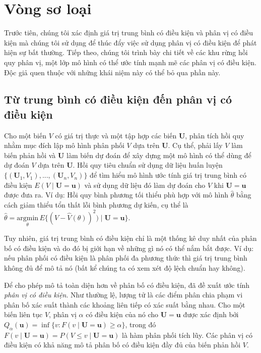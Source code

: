 \section{Vòng sơ loại}
\label{sec:prelim}

Trước tiên, chúng tôi xác định giá trị trung bình có điều kiện và phân vị có điều kiện mà chúng tôi sử dụng để thúc đẩy việc sử dụng phân vị có điều kiện để phát hiện sự bất thường. Tiếp theo, chúng tôi trình bày chi tiết về các khu rừng hồi quy phân vị, một lớp mô hình có thể ước tính mạnh mẽ các phân vị có điều kiện. Độc giả quen thuộc với những khái niệm này có thể bỏ qua phần này.


\subsection{Từ trung bình có điều kiện đến phân vị có điều kiện}
\label{subsec:meantoquantiles}

Cho một biến $V$ có giá trị thực và một tập hợp các biến $\mathbf{U}$, phân tích hồi quy nhằm mục đích lập mô hình phân phối $V$ dựa trên $\mathbf{U}$. Cụ thể, phải lấy $V$ làm biến phản hồi và $\mathbf{U}$ làm biến dự đoán để xây dựng một mô hình có thể dùng để dự đoán $V$ dựa trên $\mathbf{U}$.
Hồi quy tiêu chuẩn sử dụng dữ liệu huấn luyện $\{(\mathbf{U}_{1},V_{1}),...,(\mathbf{U}_{n},V_{n})\}$ để tìm hiểu mô hình ước tính giá trị trung bình có điều kiện $E(V \mid \mathbf{U}=\mathbf{u})$ và sử dụng dữ liệu đó làm dự đoán cho $V$ khi $\mathbf{U}=\mathbf{u}$ được đưa ra. Ví dụ: Hồi quy bình phương tối thiểu phù hợp với mô hình $\hat{\theta}$ bằng cách giảm thiểu tổn thất lỗi bình phương dự kiến, cụ thể là $\hat{\theta} =  \underset{\theta}{\mathrm{argmin}}\, E\{(V-\hat{V}(\theta))^{2})\mid \mathbf{U}=\mathbf{u}\}$.

Tuy nhiên, giá trị trung bình có điều kiện chỉ là một thống kê duy nhất của phân bố có điều kiện và do đó bị giới hạn về những gì nó có thể nắm bắt được. Ví dụ: nếu phân phối có điều kiện là phân phối đa phương thức thì giá trị trung bình không đủ để mô tả nó (bất kể chúng ta có xem xét độ lệch chuẩn hay không).

Để cho phép mô tả toàn diện hơn về phân bố có điều kiện, \cite{koenker2001quantile} đã đề xuất ước tính \emph{phân vị có điều kiện}. Như thường lệ, lượng tử là các điểm phân chia phạm vi phân bố xác suất thành các khoảng liên tiếp có xác suất bằng nhau. Cho một biến liên tục $V$, phân vị $\alpha$ có điều kiện của nó cho $\mathbf{U}=\mathbf{u}$ được xác định bởi $Q_{\alpha}(\mathbf{u}) = \inf \{v: F(v \mid \mathbf{U}=\mathbf{u}) \geq \alpha\}$, trong đó $F(v \mid \mathbf{U}=\mathbf{u}) = P(V \leq v \mid \mathbf{U}=\mathbf{u})$ là hàm phân phối tích lũy. Các phân vị có điều kiện có khả năng mô tả phân bố có điều kiện đầy đủ của biến phản hồi $V$.

